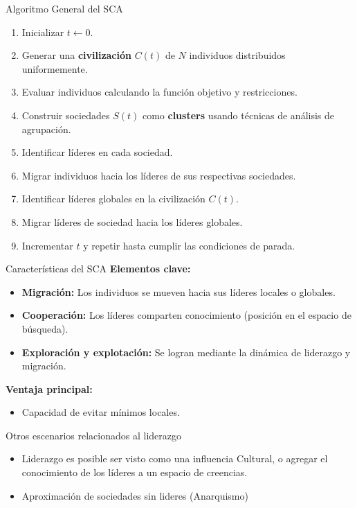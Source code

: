 \documentclass{beamer}
\begin{document}
\begin{frame}{Algoritmo General del SCA}
    \begin{enumerate}
        \item Inicializar \( t \leftarrow 0 \).
        \item Generar una \textbf{civilización} \( C(t) \) de \( N \) individuos distribuidos uniformemente.
        \item Evaluar individuos calculando la función objetivo y restricciones.
        \item Construir sociedades \( S(t) \) como \textbf{clusters} usando técnicas de análisis de agrupación.
        \item Identificar líderes en cada sociedad.
        \item Migrar individuos hacia los líderes de sus respectivas sociedades.
        \item Identificar líderes globales en la civilización \( C(t) \).
        \item Migrar líderes de sociedad hacia los líderes globales.
        \item Incrementar \( t \) y repetir hasta cumplir las condiciones de parada.
    \end{enumerate}
\end{frame}

\begin{frame}{Características del SCA}
    \textbf{Elementos clave:}
    \begin{itemize}
        \item \textbf{Migración:} Los individuos se mueven hacia sus líderes locales o globales.
        \item \textbf{Cooperación:} Los líderes comparten conocimiento (posición en el espacio de búsqueda).
        \item \textbf{Exploración y explotación:} Se logran mediante la dinámica de liderazgo y migración.
    \end{itemize}
    
    \textbf{Ventaja principal:}
    \begin{itemize}
        \item Capacidad de evitar mínimos locales.
    \end{itemize}
\end{frame}

\begin{frame}{Otros escenarios relacionados al liderazgo}
\begin{itemize}
    \item Liderazgo es posible ser visto como una influencia Cultural, o agregar el conocimiento de los líderes a un espacio de creencias.
    \item Aproximación de sociedades sin lideres (Anarquismo)
\end{itemize}
\end{frame}
\end{document}
